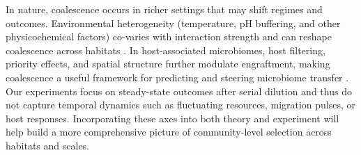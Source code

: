 In nature, coalescence occurs in richer settings that may shift regimes and outcomes. Environmental heterogeneity (temperature, pH buffering, and other physicochemical factors) co-varies with interaction strength and can reshape coalescence across habitats \citep{Rillig2015, Castledine2020, Rillig2017}. In host-associated microbiomes, host filtering, priority effects, and spatial structure further modulate engraftment, making coalescence a useful framework for predicting and steering microbiome transfer \citep{Liu2024, Smillie2018}. Our experiments focus on steady-state outcomes after serial dilution and thus do not capture temporal dynamics such as fluctuating resources, migration pulses, or host responses.  Incorporating these axes into both theory and experiment will help build a more comprehensive picture of community-level selection across habitats and scales.
